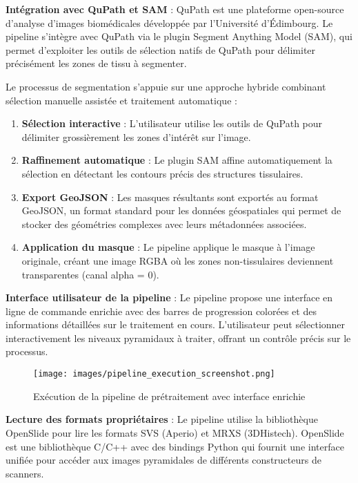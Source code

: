 \documentclass[12pt,a4paper]{report}
\begin{document}
\textbf{Intégration avec QuPath et SAM} : QuPath est une plateforme open-source d'analyse d'images biomédicales développée par l'Université d'Édimbourg. Le pipeline s'intègre avec QuPath via le plugin Segment Anything Model (SAM), qui permet d'exploiter les outils de sélection natifs de QuPath pour délimiter précisément les zones de tissu à segmenter.

Le processus de segmentation s'appuie sur une approche hybride combinant sélection manuelle assistée et traitement automatique :

\begin{enumerate}
\item \textbf{Sélection interactive} : L'utilisateur utilise les outils de QuPath pour délimiter grossièrement les zones d'intérêt sur l'image.
\item \textbf{Raffinement automatique} : Le plugin SAM affine automatiquement la sélection en détectant les contours précis des structures tissulaires.
\item \textbf{Export GeoJSON} : Les masques résultants sont exportés au format GeoJSON, un format standard pour les données géospatiales qui permet de stocker des géométries complexes avec leurs métadonnées associées.
\item \textbf{Application du masque} : Le pipeline applique le masque à l'image originale, créant une image RGBA où les zones non-tissulaires deviennent transparentes (canal alpha = 0).
\end{enumerate}

\textbf{Interface utilisateur de la pipeline} : Le pipeline propose une interface en ligne de commande enrichie avec des barres de progression colorées et des informations détaillées sur le traitement en cours. L'utilisateur peut sélectionner interactivement les niveaux pyramidaux à traiter, offrant un contrôle précis sur le processus.

\begin{figure}[H]
\centering
\texttt{[image: images/pipeline\_execution\_screenshot.png]}
\caption{Exécution de la pipeline de prétraitement avec interface enrichie}
\label{fig:pipeline_execution}
\end{figure}

\textbf{Lecture des formats propriétaires} : Le pipeline utilise la bibliothèque OpenSlide pour lire les formats SVS (Aperio) et MRXS (3DHistech). OpenSlide est une bibliothèque C/C++ avec des bindings Python qui fournit une interface unifiée pour accéder aux images pyramidales de différents constructeurs de scanners.
\end{document}
